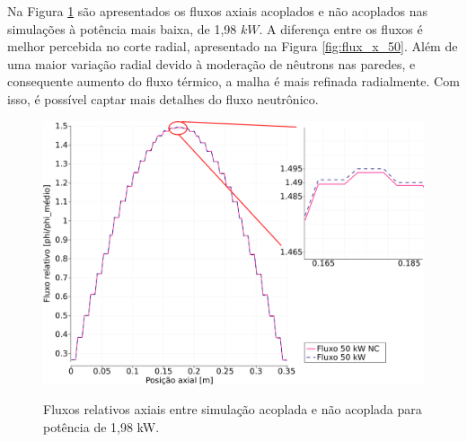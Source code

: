 Na Figura \ref{fig:flux_z_50} são apresentados os fluxos axiais acoplados e não acoplados nas simulações
à potência mais baixa, de 1,98 $kW$. A diferença entre os fluxos é melhor percebida no corte radial,
apresentado na Figura \ref{fig:flux_x_50}. Além de uma maior variação radial devido à moderação de nêutrons
nas paredes, e consequente aumento do fluxo térmico, a malha é mais refinada radialmente. Com isso, é possível
captar mais detalhes do fluxo neutrônico.


\begin{figure}[htb]
  \caption{Fluxos relativos axiais entre simulação acoplada e não acoplada para
    potência de 1,98 kW.}
  \centering\includegraphics[scale=0.5]{figuras/Flux_rel_z_50_port_trabalhado.png}
  \label{fig:flux_z_50}
\end{figure}

